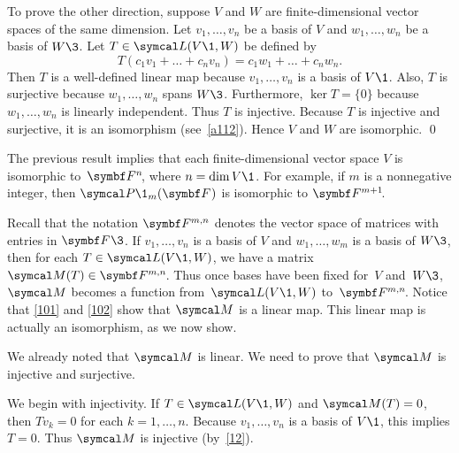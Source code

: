 To prove the other direction, suppose $V$ and $W$ are finite-dimensional
vector spaces of the same dimension.  Let $v_1, \dots, v_n$ be a basis of
$V$ and $w_1, \dots, w_n$ be a basis of $W\3$.  Let $T \in \L(V\1, W)$ be defined by
\[
T(c_1 v_1 + \dots + c_n v_n) = c_1 w_1 + \dots + c_n w_n.
\]
Then $T$ is a well-defined linear map because $v_1, \dots, v_n$ is a basis of $V\1$. Also, $T$ is surjective because $w_1, \dots, w_n$ spans $W\3$. Furthermore, $\ker T = \{0\}$ because $w_1, \dots, w_n$ is linearly independent. Thus $T$ is injective.  Because $T$ is injective and surjective, it is an isomorphism (see~\ref{a112}). Hence $V$  and $W$ are  isomorphic.
\qed


The previous result implies that each finite-dimensional vector space $V$ is isomorphic to~$\FF{n}$, where $n = \dim V\1$. For example, if $m$ is a nonnegative integer, then $\P\1_m(\F{})$ is isomorphic to $\FF{m+1}$.

Recall that the notation $\F{m,n}$ denotes the vector space of  matrices with entries in $\F{}\3$. If $v_1, \dots, v_n$ is a basis of $V$ and $w_1, \dots, w_m$ is a basis of $W\3$,
then for each $T \in \L(V\1,W)$, we have a matrix $\M(T) \in  \FF{m,n}$. Thus once bases have been fixed for~$V$ and~$W\3$, $\M$ becomes a function from~$\L(V\1,W)$ to~$\FF{m,n}$. Notice that
\ref{101} and \ref{102} show that $\M$ is a linear map.
This linear map is actually an isomorphism, as we now show.


\proof
We already noted that $\M$ is linear. We need to prove that $\M$ is
injective and surjective.

We begin with injectivity.  If $T \in  \L(V\1,W)$ and $\M(T) = 0$, then $Tv_k = 0$ for each
$k = 1, \dots, n$.  Because $v_1, \dots, v_n$ is a basis of $V\1$, this implies
$T = 0$.  Thus $\M$ is injective (by~\ref{12}).

